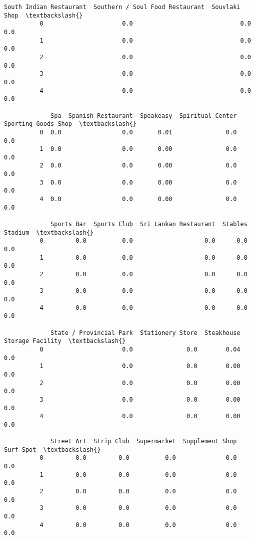 \documentclass[11pt]{article}
\begin{document}
\begin{Verbatim}[commandchars=\\\{\}]
             South Indian Restaurant  Southern / Soul Food Restaurant  Souvlaki Shop  \textbackslash{}
          0                      0.0                              0.0            0.0   
          1                      0.0                              0.0            0.0   
          2                      0.0                              0.0            0.0   
          3                      0.0                              0.0            0.0   
          4                      0.0                              0.0            0.0   
          
             Spa  Spanish Restaurant  Speakeasy  Spiritual Center  Sporting Goods Shop  \textbackslash{}
          0  0.0                 0.0       0.01               0.0                  0.0   
          1  0.0                 0.0       0.00               0.0                  0.0   
          2  0.0                 0.0       0.00               0.0                  0.0   
          3  0.0                 0.0       0.00               0.0                  0.0   
          4  0.0                 0.0       0.00               0.0                  0.0   
          
             Sports Bar  Sports Club  Sri Lankan Restaurant  Stables  Stadium  \textbackslash{}
          0         0.0          0.0                    0.0      0.0      0.0   
          1         0.0          0.0                    0.0      0.0      0.0   
          2         0.0          0.0                    0.0      0.0      0.0   
          3         0.0          0.0                    0.0      0.0      0.0   
          4         0.0          0.0                    0.0      0.0      0.0   
          
             State / Provincial Park  Stationery Store  Steakhouse  Storage Facility  \textbackslash{}
          0                      0.0               0.0        0.04               0.0   
          1                      0.0               0.0        0.00               0.0   
          2                      0.0               0.0        0.00               0.0   
          3                      0.0               0.0        0.00               0.0   
          4                      0.0               0.0        0.00               0.0   
          
             Street Art  Strip Club  Supermarket  Supplement Shop  Surf Spot  \textbackslash{}
          0         0.0         0.0          0.0              0.0        0.0   
          1         0.0         0.0          0.0              0.0        0.0   
          2         0.0         0.0          0.0              0.0        0.0   
          3         0.0         0.0          0.0              0.0        0.0   
          4         0.0         0.0          0.0              0.0        0.0   
          

\end{Verbatim}
\end{document}
